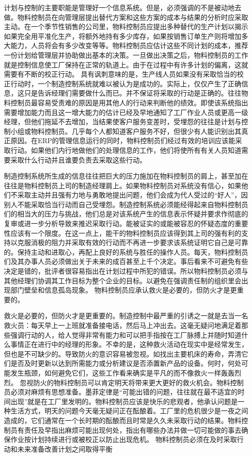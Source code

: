     计划与控制的主要职能是管理好一个信息系统。但是，必须强调的不是被动地去做。物料控制员在向管理层提出替代方案和这些方案的成本与结果的分析时应采取主动。在一个季节性销售的公司里，物料控制员应提出多种替代的生产计划以揭示如果完全用平准化生产，将额外地持有多少库存，如果按销售订单生产则将增加多大能力，人员将会有多少改变等等。物料控制员应估计这些不同计划的成本，推荐一份计划给管理层并协助做出基本的决策。一旦做出决策之后，物料控制员的工作就是控制信息使工厂保持在正常的轨道上。由于在过程中有许多计划的偏离，这就需要有不断的校正行动。 具有讽刺意味的是，生产线人员如果没有采取恰当的校正行动时，一个制造控制系统就难以被认为是成功的。实际上，仅仅产生了正确信息，这只是告诉经理们需要做什么而已。并不保证将采取的行动是正确的。往往物料控制员最容易受责难的原因是用其他人的行动来判断他的绩效。即使该系统指出需要增加能力而且这一增大能力的估计已经及早地通知了工厂作业人员或更高一级经理，但他们拖延不去增加，当结果使客户服务变差时，受埋怨的往往是计划与控制小组或物料控制员。几乎每个人都知道客户服务不好，但很少有人能识别出其真正原因。在ERP的管理信息运行的同时，物料控制员们经过有效的培训应该能采取行动。如果他们内行地做他们的处理信息的工作，他们将使所有有关人员知道需要采取什么行动并且谁要负责去采取这些行动。

    制造控制系统所生成的信息往往把巨大的压力施加在物料控制员的肩上，甚至加在往往是物料控制员上司的制造经理肩上。如果物料控制员对系统没有信心，如果他们不采取主动并且强有力地与勇敢地提出问题，他们会成为代人受过的“好人”，因别人不能采取恰当行动而自己受埋怨。制造控制系统必须能经得起来自物料控制员们的相当大的压力与挑战，他们总是对该系统产生的信息表示怀疑并要求作彻底的复审或进一步分析导致来推迟采取行动。能被证实的或能被容忍的怀疑态度的重要性应该有一个限度。在这一点上，能干的物料控制员应该得到其上司的强有利的支持以克服消极的阻力并采取有效的行动而不再进一步要求该系统证明它自己是可靠的。保持主动和进取心，再配上良好的系统与胜任的操作人员。每天，物料控制员们及其办事人员必须做出关于未来的成百甚至上千个决定。事后看来不可避免有些决定是错的，批评者很容易指出在计划过程中所犯的错误。所以物料控制员必须与其他经理们协调其工作目标为整个企业的目标。以避免在强调责任制的组织里会出现部门壁垒和信息孤岛现象。 物料控制员应承认救火是必要的，但防火才是更重要的。

    救火是必要的，但防火才是更重要的。制造控制中最严重的引诱之一就是去当一名救火员：每天早上一上班就准备接电话，然后马上冲出去。这毫无疑问地满足着那些强调行动的人，给人觉得非常有能力和可以把手指按在工厂脉搏上并随时知道什么事情正在进行中的经理的形象。不幸的是，这种救火活动在现实中是经常发生，但也是不可缺少的。导致防火的意识容易被忽视。如找出主要机床的寿命，弄清它们是否及时更新以达到所需能力或分析建议是否添置新产品的设备。何时，何处可能发生瓶颈，如何避免它们，这些工作看来确实是平凡的而不像救火一样轰轰烈烈。 忽视防火的物料控制员可以肯定明天将带来更大更好的救火机会。物料控制员必须对麻烦有思想准备。墨菲定律是“可能出错的问题，往往就在最不适宜的时间出现”就是在工厂里发明的。物料控制员应该是快乐的悲观者，他承认问题是一种生活方式，明天的问题今天毫无疑问正在酝酿着。工厂里的危机很少是一夜之间造成的，它们通常在一个长时期的酝酿而且时常是久久未采取行动的结果。物料控制员有责任及早指出麻烦可能出现何处，指出有哪些办法并做一切可能做的事去确保作业按计划持续进行或被校正以防止出现危机。 物料控制员必须在及时采取行动和未来准备改善计划之间取得平衡

